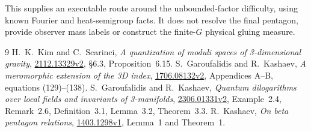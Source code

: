 \documentclass[11pt,a4paper]{article}
\begin{document}
This supplies an executable route around the unbounded-factor
difficulty, using known Fourier and heat-semigroup facts.
It does not resolve the final pentagon, provide observer mass labels
or construct the finite-$G$ physical gluing measure.

\begin{thebibliography}{9}\small
{} H.~K.~Kim and C.~Scarinci,
\emph{A quantization of moduli spaces of 3-dimensional gravity},
\href{https://arxiv.org/abs/2112.13329v2}{2112.13329v2},
\S6.3, Proposition~6.15.
 S.~Garoufalidis and R.~Kashaev,
\emph{A meromorphic extension of the 3D index},
\href{https://arxiv.org/abs/1706.08132v2}{1706.08132v2},
Appendices A--B, equations (129)--(138).
 S.~Garoufalidis and R.~Kashaev,
\emph{Quantum dilogarithms over local fields and invariants of 3-manifolds},
\href{https://arxiv.org/abs/2306.01331v2}{2306.01331v2},
Example~2.4, Remark~2.6, Definition~3.1, Lemma~3.2, Theorem~3.3.
 R.~Kashaev, \emph{On beta pentagon relations},
\href{https://arxiv.org/abs/1403.1298v1}{1403.1298v1},
Lemma~1 and Theorem~1.
\end{thebibliography}
\end{document}
